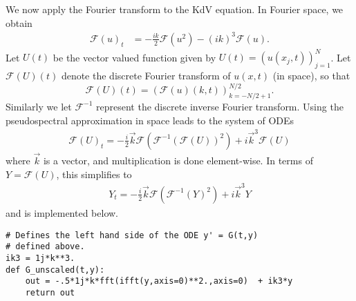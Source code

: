 We now apply the Fourier transform to the KdV equation.
In Fourier space, we obtain 
\begin{align*}
	\mathcal{F}(u)_t &= -\frac{ik}{2}\mathcal{F}(u^2)- (ik)^3\mathcal{F}(u).
\end{align*}
Let $U(t)$ be the vector valued function given by $U(t) = (u(x_j,t))_{j=1}^N$.
Let $\mathcal{F}(U)(t)$ denote the discrete Fourier transform of $u(x,t)$ (in space), so that 
\[
\mathcal{F}(U)(t) = (\mathcal{F}(u)(k,t))_{k=-N/2+1}^{N/2}.
\]
Similarly we let $\mathcal{F}^{-1}$ represent the discrete inverse Fourier transform.
Using the pseudospectral approximation in space leads to the system of ODEs
\begin{align}
	\mathcal{F}(U)_t =  -\frac{i}{2} \vec{k}\mathcal{F}\left( \mathcal{F}^{-1}(\mathcal{F}(U))^2\right) + i\vec{k}^3\mathcal{F}(U)
\end{align}
where $\vec{k}$ is a vector, and multiplication is done element-wise. In terms of $Y = \mathcal{F}(U)$, this simplifies to 
\begin{align}
	Y_t =  -\frac{i}{2} \vec{k}\mathcal{F}\left( \mathcal{F}^{-1}(Y)^2\right) + i\vec{k}^3Y
	\label{lab:solitons:pseudospectral}
\end{align}
and is implemented below.
\begin{lstlisting}
# Defines the left hand side of the ODE y' = G(t,y)
# defined above.
ik3 = 1j*k**3.
def G_unscaled(t,y):
	out = -.5*1j*k*fft(ifft(y,axis=0)**2.,axis=0)  + ik3*y        
	return out
\end{lstlisting}

